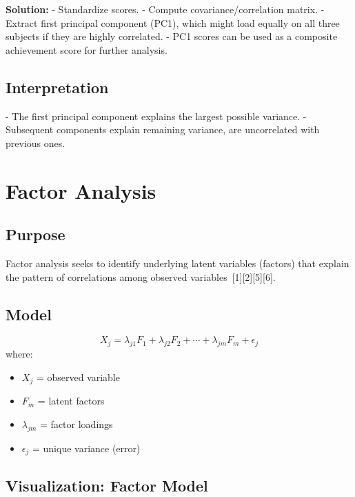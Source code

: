 \documentclass[11pt]{article}
\begin{document}
\textbf{Solution:}
- Standardize scores.
- Compute covariance/correlation matrix.
- Extract first principal component (PC1), which might load equally on all three subjects if they are highly correlated.
- PC1 scores can be used as a composite achievement score for further analysis.

\subsection{Interpretation}

- The first principal component explains the largest possible variance.
- Subsequent components explain remaining variance, are uncorrelated with previous ones.

\section{Factor Analysis}

\subsection{Purpose}

Factor analysis seeks to identify underlying latent variables (factors) that explain the pattern of correlations among observed variables\ [1][2][5][6].

\subsection{Model}

\[
X_j = \lambda_{j1}F_1 + \lambda_{j2}F_2 + \cdots + \lambda_{jm}F_m + \epsilon_j
\]
where:
\begin{itemize}
    \item $X_j$ = observed variable
    \item $F_m$ = latent factors
    \item $\lambda_{jm}$ = factor loadings
    \item $\epsilon_j$ = unique variance (error)
\end{itemize}

\subsection*{Visualization: Factor Model}
\begin{center}
\end{center}
\end{document}
